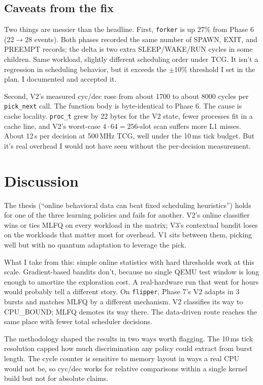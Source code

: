 \documentclass[11pt]{article}
\begin{document}
\subsection*{Caveats from the fix}

Two things are messier than the headline. First, \texttt{forker} is up 27\%
from Phase 6 (22$\to$28 events). Both phases recorded the same number of
SPAWN, EXIT, and PREEMPT records; the delta is two extra SLEEP/WAKE/RUN
cycles in some children. Same workload, slightly different scheduling order
under TCG. It isn't a regression in scheduling behavior, but it exceeds the
$\pm 10$\% threshold I set in the plan. I documented and accepted it.

Second, V2's measured cyc/dec rose from about 1700 to about 8000 cycles per
\texttt{pick\_next} call. The function body is byte-identical to Phase 6.
The cause is cache locality. \texttt{proc\_t} grew by 22 bytes for the V2
state, fewer processes fit in a cache line, and V2's worst-case
$4 \cdot 64 = 256$-slot scan suffers more L1 misses. About 12\,\textmu s
per decision at 500\,MHz TCG, well under the 10\,ms tick budget. But it's
real overhead I would not have seen without the per-decision measurement.

\section{Discussion}
\label{sec:discussion}

The thesis (``online behavioral data can beat fixed scheduling heuristics'')
holds for one of the three learning policies and fails for another. V2's
online classifier wins or ties MLFQ on every workload in the matrix; V3's
contextual bandit loses on the workloads that matter most for overhead. V1
sits between them, picking well but with no quantum adaptation to leverage
the pick.

What I take from this: simple online statistics with hard thresholds work
at this scale. Gradient-based bandits don't, because no single QEMU test
window is long enough to amortize the exploration cost. A real-hardware
run that went for hours would probably tell a different story. On
\texttt{flipper}, Phase 7's V2 adapts in 3 bursts and matches MLFQ by a
different mechanism. V2 classifies its way to CPU\_BOUND; MLFQ demotes its
way there. The data-driven route reaches the same place with fewer total
scheduler decisions.

The methodology shaped the results in two ways worth flagging. The 10\,ms
tick resolution capped how much discrimination any policy could extract
from burst length. The cycle counter is sensitive to memory layout in ways
a real CPU would not be, so cyc/dec works for relative comparisons within
a single kernel build but not for absolute claims.
\end{document}
